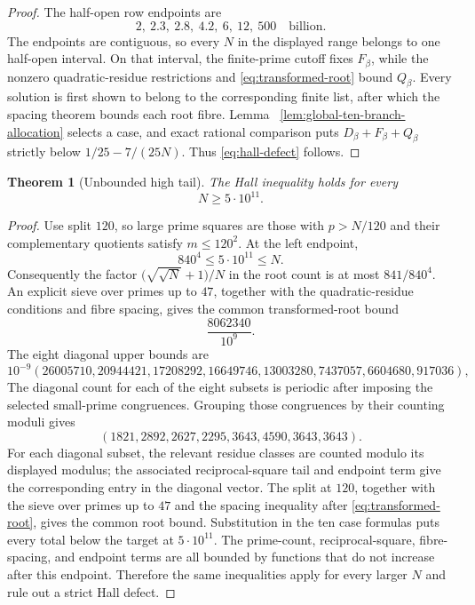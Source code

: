 \documentclass[11pt]{article}
\newtheorem{theorem}{Theorem}[section]
\theoremstyle{definition}
\newcommand{\FiveHundredBillion}{5\cdot10^{11}}
\begin{document}
\begin{proof}
The half-open row endpoints are
\[
 2,\ 2.3,\ 2.8,\ 4.2,\ 6,\ 12,\ 500
\quad\text{billion}.
\]
The endpoints are contiguous, so every $N$ in the displayed range belongs
to one half-open interval.  On that interval, the finite-prime cutoff fixes
$F_\beta$, while the nonzero quadratic-residue restrictions and
 \eqref{eq:transformed-root} bound $Q_\beta$.  Every solution is first shown to
 belong to the corresponding finite list, after which the spacing theorem
 bounds each root fibre.  Lemma
~\ref{lem:global-ten-branch-allocation} selects a case, and exact rational
comparison puts $D_\beta+F_\beta+Q_\beta$ strictly below
$1/25-7/(25N)$.  Thus \eqref{eq:hall-defect} follows.
\end{proof}

\begin{theorem}[Unbounded high tail]\label{thm:unbounded-high-tail}
The Hall inequality holds for every
\[
 N\geq\FiveHundredBillion.
\]
\end{theorem}

\begin{proof}
Use split $120$, so large prime squares are those with $p>N/120$ and their
 complementary quotients satisfy $m\leq120^2$.  At the left endpoint,
\[
 840^4\leq\FiveHundredBillion\leq N.
\]
Consequently the factor
$\bigl(\sqrt{\sqrt N}+1\bigr)/N$ in the root count is at most
 $841/840^4$.
 An explicit sieve over primes up to $47$, together with the quadratic-residue
 conditions and fibre spacing, gives the common transformed-root bound
\[
 \frac{8062340}{10^9}.
\]
 The eight diagonal upper bounds are
\[
 10^{-9}(26005710,20944421,17208292,16649746,
 13003280,7437057,6604680,917036),
\]
The diagonal count for each of the eight subsets is periodic after imposing
 the selected small-prime congruences.  Grouping those congruences by their
 counting moduli gives
\[
 (1821,2892,2627,2295,3643,4590,3643,3643).
\]
For each diagonal subset, the relevant residue classes are counted modulo its
 displayed modulus; the associated reciprocal-square tail and endpoint
term give the corresponding entry in the diagonal vector.  The split at
$120$, together with the sieve over primes up to $47$ and the spacing inequality after
\eqref{eq:transformed-root}, gives the common root bound.  Substitution in the
ten case formulas puts every total below the target at
$\FiveHundredBillion$.  The prime-count, reciprocal-square, fibre-spacing,
and endpoint terms are all bounded by functions that do not increase after
this endpoint.  Therefore the same inequalities apply for every larger $N$
and rule out a strict Hall defect.
\end{proof}
\end{document}
